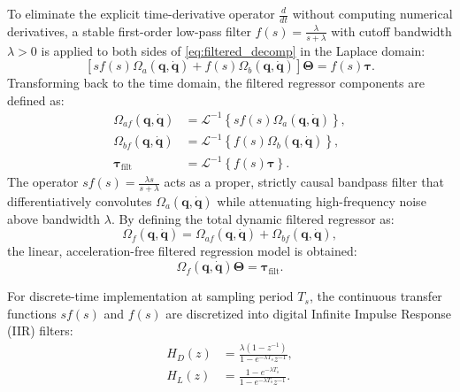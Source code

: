 \documentclass[lettersize,journal]{IEEEtran}
\begin{document}
To eliminate the explicit time-derivative operator $\frac{d}{dt}$ without computing numerical derivatives, a stable first-order low-pass filter $f(s) = \frac{\lambda}{s + \lambda}$ with cutoff bandwidth $\lambda > 0$ is applied to both sides of \eqref{eq:filtered_decomp} in the Laplace domain:
\begin{equation}
	\left[ s f(s)\Omega_a(\bm{q}, \dot{\bm{q}}) + f(s)\Omega_b(\bm{q}, \dot{\bm{q}}) \right]\bm{\Theta} = f(s)\bm{\tau}.
	\label{eq:filtered_laplace}
\end{equation}
Transforming back to the time domain, the filtered regressor components are defined as:
\begin{align}
	\Omega_{af}(\bm{q}, \dot{\bm{q}}) &= \mathcal{L}^{-1}\left\{ s f(s)\Omega_a(\bm{q}, \dot{\bm{q}}) \right\}, \label{eq:omega_af} \\
	\Omega_{bf}(\bm{q}, \dot{\bm{q}}) &= \mathcal{L}^{-1}\left\{ f(s)\Omega_b(\bm{q}, \dot{\bm{q}}) \right\}, \label{eq:omega_bf} \\
	\bm{\tau}_{\text{filt}} &= \mathcal{L}^{-1}\left\{ f(s)\bm{\tau} \right\}. \label{eq:tau_filt_def}
\end{align}
The operator $s f(s) = \frac{\lambda s}{s + \lambda}$ acts as a proper, strictly causal bandpass filter that differentiatively convolutes $\Omega_a(\bm{q}, \dot{\bm{q}})$ while attenuating high-frequency noise above bandwidth $\lambda$. By defining the total dynamic filtered regressor as:
\begin{equation}
	\Omega_f(\bm{q}, \dot{\bm{q}}) = \Omega_{af}(\bm{q}, \dot{\bm{q}}) + \Omega_{bf}(\bm{q}, \dot{\bm{q}}),
	\label{eq:total_omega_f}
\end{equation}
the linear, acceleration-free filtered regression model is obtained:
\begin{equation}
	\Omega_f(\bm{q}, \dot{\bm{q}})\bm{\Theta} = \bm{\tau}_{\text{filt}}.
	\label{eq:dynamic_filtered_model}
\end{equation}

For discrete-time implementation at sampling period $T_s$, the continuous transfer functions $s f(s)$ and $f(s)$ are discretized into digital Infinite Impulse Response (IIR) filters:
\begin{align}
	H_D(z) &= \frac{\lambda(1 - z^{-1})}{1 - e^{-\lambda T_s} z^{-1}}, \label{eq:discrete_diff} \\
	H_L(z) &= \frac{1 - e^{-\lambda T_s}}{1 - e^{-\lambda T_s} z^{-1}}. \label{eq:discrete_lowpass}
\end{align}
\end{document}
